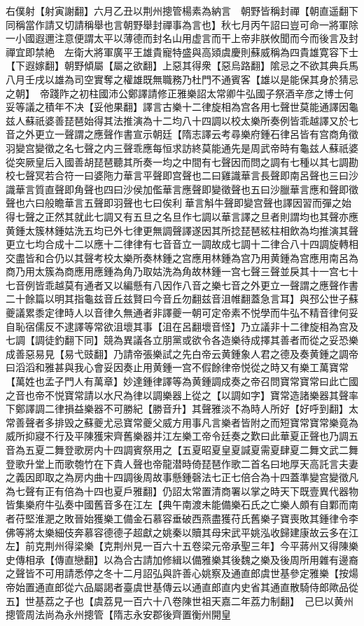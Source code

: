 右僕射【射寅謝翻】六月乙丑以荆州摠管楊素為納言　朝野皆稱封禪【朝直遥翻下同稱當作請又切請稱舉也言朝野舉封禪事為言也】秋七月丙午詔曰豈可命一將軍除一小國遐邇注意便謂太平以薄德而封名山用虚言而干上帝非朕攸聞而今而後言及封禪宜即禁絶　左衛大將軍廣平王雄貴寵特盛與高熲虞慶則蘇威稱為四貴雄寛容下士【下遐嫁翻】朝野傾屬【屬之欲翻】上惡其得衆【惡烏路翻】隂忌之不欲其典兵馬八月壬戌以雄為司空實奪之權雄既無職務乃杜門不通賓客【雄以是能保其身於猜忌之朝】　帝踐阼之初柱國沛公鄭譯請修正雅樂詔太常卿牛弘國子祭酒辛彦之博士何妥等議之積年不决【妥他果翻】譯言古樂十二律旋相為宫各用七聲世莫能通譯因龜兹人蘇祇婆善琵琶始得其法推演為十二均八十四調以校太樂所奏例皆乖越譯又於七音之外更立一聲謂之應聲作書宣示朝廷【隋志譯云考尋樂府鍾石律呂皆有宫商角徵羽變宫變徵之名七聲之内三聲乖應每恒求訪終莫能通先是周武帝時有龜兹人蘇祇婆從突厥皇后入國善胡琵琶聽其所奏一均之中間有七聲因而問之調有七種以其七調勘校七聲冥若合符一曰婆陁力華言平聲即宫聲也二曰雞識華言長聲即南呂聲也三曰沙識華言質直聲即角聲也四曰沙侯加儖華言應聲即變徵聲也五曰沙臘華言應和聲即徵聲也六曰般瞻華言五聲即羽聲也七曰俟利華言斛牛聲即變宫聲也譯因習而彈之始得七聲之正然其就此七調又有五旦之名旦作七調以華言譯之旦者則謂均也其聲亦應黄鍾太簇林鍾姑洗五均已外七律更無調聲譯遂因其所捻琵琶絃柱相飲為均推演其聲更立七均合成十二以應十二律律有七音音立一調故成七調十二律合八十四調旋轉相交盡皆和合仍以其聲考校太樂所奏林鍾之宫應用林鍾為宫乃用黄鍾為宫應用南呂為商乃用太簇為商應用應鍾為角乃取姑洗為角故林鍾一宫七聲三聲並戾其十一宫七十七音例皆乖越莫有通者又以編懸有八因作八音之樂七音之外更立一聲謂之應聲作書二十餘篇以明其指龜兹音丘兹賢曰今音丘勿翻兹音沮帷翻蓋急言耳】與邳公世子蘇夔議累黍定律時人以音律久無通者非譯夔一朝可定帝素不悦學而牛弘不精音律何妥自恥宿儒反不逮譯等常欲沮壞其事【沮在呂翻壞音怪】乃立議非十二律旋相為宫及七調【調徒釣翻下同】競為異議各立朋黨或欲令各造樂待成擇其善者而從之妥恐樂成善惡易見【易弋豉翻】乃請帝張樂試之先白帝云黄鍾象人君之德及奏黄鍾之調帝曰滔滔和雅甚與我心會妥因奏止用黄鍾一宫不假餘律帝悦從之時又有樂工萬寶常【萬姓也孟子門人有萬章】妙達鍾律譯等為黄鍾調成奏之帝召問寶常寶常曰此亡國之音也帝不悦寶常請以水尺為律以調樂器上從之【以調如字】寶常造諸樂器其聲率下鄭譯調二律損益樂器不可勝紀【勝音升】其聲雅淡不為時人所好【好呼到翻】太常善聲者多排毁之蘇夔尤忌寶常夔父威方用事凡言樂者皆附之而短寶常寶常樂竟為威所抑寢不行及平陳獲宋齊舊樂器并江左樂工帝令廷奏之歎曰此華夏正聲也乃調五音為五夏二舞登歌房内十四調賓祭用之【五夏昭夏皇夏諴夏需夏肆夏二舞文武二舞登歌升堂上而歌匏竹在下貴人聲也帝龍潜時倚琵琶作歌二首名曰地厚天高託言夫妻之義因即取之為房内曲十四調後周故事懸鍾磬法七正七倍合為十四蓋準變宫變徵凡為七聲有正有倍為十四也夏戶雅翻】仍詔太常置清商署以掌之時天下既壹異代器物皆集樂府牛弘奏中國舊音多在江左【典午南渡未能備樂石氏之亡樂人頗有自鄴而南者苻堅淮淝之敗晉始獲樂工備金石慕容垂破西燕盡獲苻氏舊樂子寶喪敗其鍾律令李佛等將太樂細伎奔慕容德德子超獻之姚秦以贖其母宋武平姚泓收歸建康故云多在江左】前克荆州得梁樂【克荆州見一百六十五卷梁元帝承聖三年】今平蔣州又得陳樂史傳相承【傳直戀翻】以為合古請加修緝以備雅樂其後魏之樂及後周所用雜有邊裔之聲皆不可用請悉停之冬十二月詔弘與許善心姚察及通直郎虞世基參定雅樂【按煬帝始置通直郎從六品屬謁者臺虞世基傳云以通直郎直内史省其通直散騎侍郎歟品從五】世基荔之子也【虞荔見一百六十八卷陳世祖天嘉二年荔力制翻】　己巳以黄州摠管周法尚為永州摠管【隋志永安郡後齊置衡州開皇